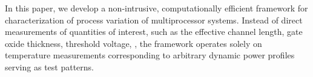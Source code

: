 In this paper, we develop a non-intrusive, computationally efficient framework for characterization of process variation of multiprocessor systems. Instead of direct measurements of quantities of interest, such as the effective channel length, gate oxide thickness, threshold voltage, \etc, the framework operates solely on temperature measurements corresponding to arbitrary dynamic power profiles serving as test patterns.
